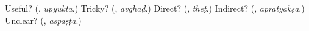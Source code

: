 \begin{tcolorbox}[breakable,colback=teal!4,colframe=teal!35!black,title={Before you move on}]
Useful? (\textbf{}, \emph{upyukta}.) Tricky? (\textbf{}, \emph{avghaḍ}.) Direct? (\textbf{}, \emph{theṭ}.) Indirect? (\textbf{}, \emph{apratyakṣa}.) Unclear? (\textbf{}, \emph{aspaṣṭa}.)
\end{tcolorbox}
